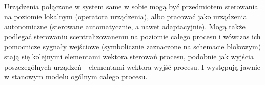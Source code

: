 \documentclass{article}
\begin{document}
		Urządzenia połączone w system same w sobie mogą być przedmiotem sterowania na
		poziomie lokalnym (operatora urządzenia), albo pracować jako urządzenia
		autonomiczne (sterowane automatycznie, a nawet adaptacyjnie). Mogą także
		podlegać sterowaniu scentralizowanemu na poziomie całego procesu i wówczas ich
		pomocnicze sygnały wejściowe (symbolicznie zaznaczone na schemacie blokowym)
		stają się kolejnymi elementami wektora sterowań procesu, podobnie jak wyjścia
		poszczególnych urządzeń - elementami wektora wyjść procesu. I występują jawnie w
		stanowym modelu ogólnym całego procesu.
\end{document}
